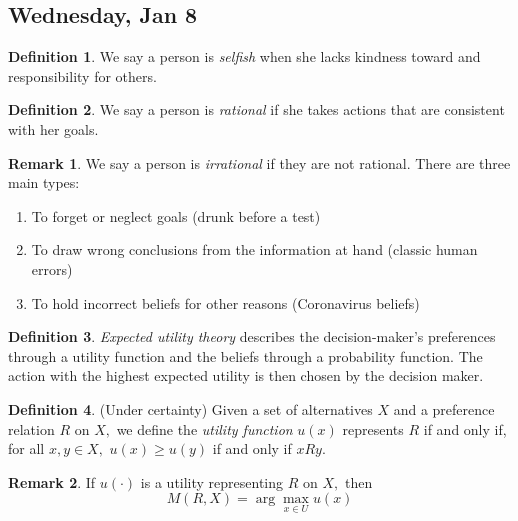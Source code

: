 \documentclass[10pt, oneside]{article}
\theoremstyle{definition}
\newtheorem{defn}{Definition}
\newtheorem{rem}{Remark}
\begin{document}
\subsection{Wednesday, Jan 8}
\begin{defn}
    We say a person is \textit{selfish} when she lacks kindness toward and responsibility for others.
\end{defn}
\begin{defn}
    We say a person is \textit{rational} if she takes actions that are consistent with her goals.
\end{defn}
\begin{rem}
    We say a person is \textit{irrational} if they are not rational. There are three main types:
    \begin{enumerate}
        \item To forget or neglect goals (drunk before a test)
        \item To draw wrong conclusions from the information at hand (classic human errors)
        \item To hold incorrect beliefs for other reasons (Coronavirus beliefs)
    \end{enumerate}
\end{rem}
\begin{defn}
    \textit{Expected utility theory} describes the decision-maker's preferences through a utility function and the beliefs through a probability function. The action with the highest expected utility is then chosen by the decision maker.
\end{defn}

\begin{defn}
(Under certainty)
    Given a set of alternatives $X$ and a preference relation $R$ on $X,$ we define the \textit{utility function} $u(x)$ represents $R$ if and only if, for all $x,y \in X,$ $u(x) \geq u(y)$ if and only if $xRy.$
\end{defn}
\begin{rem}
    If $u(\cdot)$ is a utility representing $R$ on $X,$ then 
    \[M(R, X) = \arg\max_{x\in U}u(x)\]
\end{rem}
\end{document}
